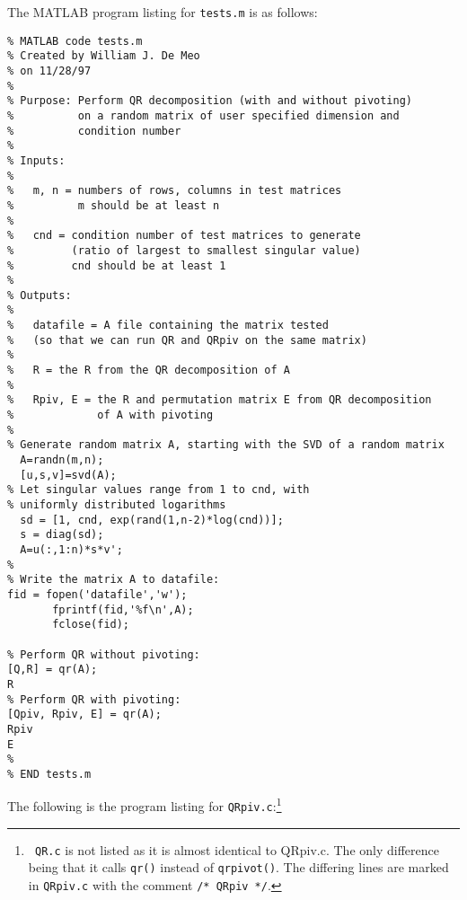 \documentclass{article}
\begin{document}
The MATLAB program listing for {\tt tests.m} is as follows:
\begin{verbatim}
% MATLAB code tests.m
% Created by William J. De Meo
% on 11/28/97
%
% Purpose: Perform QR decomposition (with and without pivoting)
%          on a random matrix of user specified dimension and
%          condition number
%
% Inputs: 
%
%   m, n = numbers of rows, columns in test matrices
%          m should be at least n
%
%   cnd = condition number of test matrices to generate
%         (ratio of largest to smallest singular value)
%         cnd should be at least 1
%
% Outputs:
%
%   datafile = A file containing the matrix tested
%   (so that we can run QR and QRpiv on the same matrix)
%   
%   R = the R from the QR decomposition of A
% 
%   Rpiv, E = the R and permutation matrix E from QR decomposition 
%             of A with pivoting
%
% Generate random matrix A, starting with the SVD of a random matrix
  A=randn(m,n);
  [u,s,v]=svd(A);
% Let singular values range from 1 to cnd, with
% uniformly distributed logarithms
  sd = [1, cnd, exp(rand(1,n-2)*log(cnd))];
  s = diag(sd);
  A=u(:,1:n)*s*v';
%
% Write the matrix A to datafile:
fid = fopen('datafile','w');
       fprintf(fid,'%f\n',A);
       fclose(fid);

% Perform QR without pivoting:
[Q,R] = qr(A);
R
% Perform QR with pivoting:
[Qpiv, Rpiv, E] = qr(A);
Rpiv
E
%
% END tests.m
\end{verbatim}
The following is the program listing for {\tt QRpiv.c}:\footnote{{\tt
    QR.c} is not listed as it
is almost identical to QRpiv.c.  The only difference being that it calls
{\tt qr()} instead of {\tt qrpivot()}.  
The differing lines are marked in {\tt QRpiv.c} with the comment {\tt /*
  QRpiv */}.}
\end{document}
